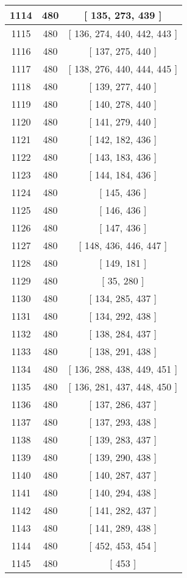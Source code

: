 \begin{center}
\begin{longtable}[H]{|| c c c ||}
\hline
1114 & 480 & [ 135, 273, 439 ] \\ 
\hline
1115 & 480 & [ 136, 274, 440, 442, 443 ] \\ 
\hline
1116 & 480 & [ 137, 275, 440 ] \\ 
\hline
1117 & 480 & [ 138, 276, 440, 444, 445 ] \\ 
\hline
1118 & 480 & [ 139, 277, 440 ] \\ 
\hline
1119 & 480 & [ 140, 278, 440 ] \\ 
\hline
1120 & 480 & [ 141, 279, 440 ] \\ 
\hline
1121 & 480 & [ 142, 182, 436 ] \\ 
\hline
1122 & 480 & [ 143, 183, 436 ] \\ 
\hline
1123 & 480 & [ 144, 184, 436 ] \\ 
\hline
1124 & 480 & [ 145, 436 ] \\ 
\hline
1125 & 480 & [ 146, 436 ] \\ 
\hline
1126 & 480 & [ 147, 436 ] \\ 
\hline
1127 & 480 & [ 148, 436, 446, 447 ] \\ 
\hline
1128 & 480 & [ 149, 181 ] \\ 
\hline
1129 & 480 & [ 35, 280 ] \\ 
\hline
1130 & 480 & [ 134, 285, 437 ] \\ 
\hline
1131 & 480 & [ 134, 292, 438 ] \\ 
\hline
1132 & 480 & [ 138, 284, 437 ] \\ 
\hline
1133 & 480 & [ 138, 291, 438 ] \\ 
\hline
1134 & 480 & [ 136, 288, 438, 449, 451 ] \\ 
\hline
1135 & 480 & [ 136, 281, 437, 448, 450 ] \\ 
\hline
1136 & 480 & [ 137, 286, 437 ] \\ 
\hline
1137 & 480 & [ 137, 293, 438 ] \\ 
\hline
1138 & 480 & [ 139, 283, 437 ] \\ 
\hline
1139 & 480 & [ 139, 290, 438 ] \\ 
\hline
1140 & 480 & [ 140, 287, 437 ] \\ 
\hline
1141 & 480 & [ 140, 294, 438 ] \\ 
\hline
1142 & 480 & [ 141, 282, 437 ] \\ 
\hline
1143 & 480 & [ 141, 289, 438 ] \\ 
\hline
1144 & 480 & [ 452, 453, 454 ] \\ 
\hline
1145 & 480 & [ 453 ] \\ 

\end{longtable}
\end{center}
